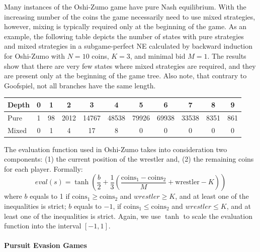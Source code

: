 Many instances of the Oshi-Zumo game have pure Nash equilibrium.
With the increasing number of the coins the game necessarily need to use mixed strategies, however, mixing is typically required only at the beginning of the game. 
As an example, the following table depicts the number of states with pure strategies and mixed strategies in a subgame-perfect NE calculated by backward induction for Oshi-Zumo with $N=10$ coins, $K=3$, and minimal bid $M=1$. The results show that there are very few states where mixed strategies are required, and they are present only at the beginning of the game tree. Also note, that contrary to Goofspiel, not all branches have the same length.

\begin{table}[h!]
\centering
\small
\begin{tabular}{|l|c|c|c|c|c|c|c|c|c|c|}
\hline Depth & 0 & 1 & 2 & 3 & 4 & 5 & 6 & 7 & 8 & 9\\
\hline Pure  & 1 & 98 & 2012 & 14767 & 48538 & 79926 & 69938 & 33538 & 8351 & 861\\
\hline Mixed & 0 &  1 &  4 &  17 & 8 & 0 & 0 & 0 & 0 & 0 \\
\hline
\end{tabular}
\end{table}
The evaluation function used in Oshi-Zumo takes into consideration two components: (1) the current position of the wrestler and, (2) the remaining coins for each player. Formally:
$$
eval(s) = \tanh\left(\frac{b}{2}+\frac{1}{3}\left(\frac{\textrm{coins}_1 - \textrm{coins}_2}{M} + \textrm{wrestler} - K\right)\right)
$$
where $b$ equals to 1 if $\textrm{coins}_1 \geq \textrm{coins}_2$ and $wrestler \geq K$, and at least one of the inequalities is strict;
$b$ equals to $-1$, if $\textrm{coins}_1 \leq \textrm{coins}_2$ and $wrestler \leq K$, and at least one of the inequalities is strict.
Again, we use $\tanh$ to scale the evaluation function into the interval $[-1,1]$.

\paragraph{\textbf{Pursuit Evasion Games}}

